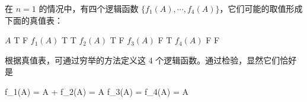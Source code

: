 在 $n = 1$ 的情况中，有四个逻辑函数 $\{f_1(A),\cdots,f_4(A)\}$，它们可能的取值形成下面的真值表：


{\startxtable[offset=4pt]
  \startxtablehead[topframe=on, rulethickness=1.5pt]
  \startxrow
  \startxcell[width=2cm] $A$ \stopxcell
  \startxcell[width=2cm] T \stopxcell
  \startxcell[width=2cm] F \stopxcell
  \stopxrow
  \stopxtablehead
  \startxtablebody
  \startxrow[topframe=on,rulethickness=0.75pt]
  \startxcell $f_1(A)$ \stopxcell
  \startxcell T  \stopxcell
  \startxcell T \stopxcell
  \stopxrow
  \startxrow
  \startxcell $f_2(A)$ \stopxcell
  \startxcell T  \stopxcell
  \startxcell F \stopxcell
  \stopxrow
  \startxrow
  \startxcell $f_3(A)$ \stopxcell
  \startxcell F \stopxcell
  \startxcell T \stopxcell
  \stopxrow          
  \stopxtablebody
  \startxtablefoot[bottomframe=on,rulethickness=1.5pt]
  \startxrow
  \startxcell $f_4(A)$ \stopxcell
  \startxcell F \stopxcell
  \startxcell F \stopxcell
  \stopxrow
  \stopxtablefoot
  \stopxtable
}

根据真值表，可通过穷举的方法定义这 4 个逻辑函数。通过检验，显然它们恰好是

\placeformula
\startformula
\startalign
\NC f_1(A) \NC = A + \NR
\NC f_2(A) \NC = A\NR
\NC f_3(A) \NC = \NR
\NC f_4(A) \NC = A\NR
\stopalign
\stopformula

